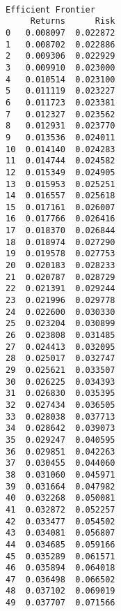 \documentclass[11pt]{article}
\begin{document}
    \begin{Verbatim}[commandchars=\\\{\}]

Efficient Frontier
     Returns      Risk
0   0.008097  0.022872
1   0.008702  0.022886
2   0.009306  0.022929
3   0.009910  0.023000
4   0.010514  0.023100
5   0.011119  0.023227
6   0.011723  0.023381
7   0.012327  0.023562
8   0.012931  0.023770
9   0.013536  0.024011
10  0.014140  0.024283
11  0.014744  0.024582
12  0.015349  0.024905
13  0.015953  0.025251
14  0.016557  0.025618
15  0.017161  0.026007
16  0.017766  0.026416
17  0.018370  0.026844
18  0.018974  0.027290
19  0.019578  0.027753
20  0.020183  0.028233
21  0.020787  0.028729
22  0.021391  0.029244
23  0.021996  0.029778
24  0.022600  0.030330
25  0.023204  0.030899
26  0.023808  0.031485
27  0.024413  0.032095
28  0.025017  0.032747
29  0.025621  0.033507
30  0.026225  0.034393
31  0.026830  0.035395
32  0.027434  0.036505
33  0.028038  0.037713
34  0.028642  0.039073
35  0.029247  0.040595
36  0.029851  0.042263
37  0.030455  0.044060
38  0.031060  0.045971
39  0.031664  0.047982
40  0.032268  0.050081
41  0.032872  0.052257
42  0.033477  0.054502
43  0.034081  0.056807
44  0.034685  0.059166
45  0.035289  0.061571
46  0.035894  0.064018
47  0.036498  0.066502
48  0.037102  0.069019
49  0.037707  0.071566

    \end{Verbatim}
\end{document}
